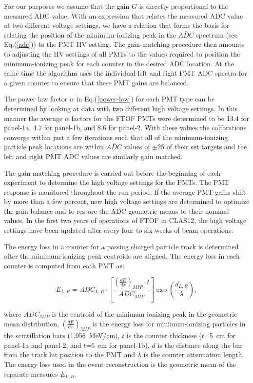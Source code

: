 \documentclass{elsart}
\begin{document}
\noindent
For our purposes we assume that the gain $G$ is directly proportional to the measured ADC value. With an
expression that relates the measured ADC value at two different voltage settings, we have a relation that
forms the basis for relating the position of the minimum-ionizing peak in the $\overline{ADC}$ spectrum
(see Eq.(\ref{adc})) to the PMT HV setting. The gain-matching procedure then amounts to adjusting the HV
settings of all PMTs to the values required to position the minimum-ionizing peak for each counter in the
desired ADC location. At the same time the algorithm uses the individual left and right PMT ADC spectra for
a given counter to ensure that these PMT gains are balanced.

The power law factor $\alpha$ in Eq.(\ref{power-law}) for each PMT type can be determined by looking
at data with two different high voltage settings. In this manner the average $\alpha$ factors for the
FTOF PMTs were determined to be 13.4 for panel-1a, 4.7 for panel-1b, and 8.6 for panel-2. With these
values the calibrations converge within just a few iterations such that all of the minimum-ionizing particle
peak locations are within $\overline{ADC}$ values of $\pm$25 of their set targets and the left and right
PMT ADC values are similarly gain matched.

The gain matching procedure is carried out before the beginning of each experiment to determine the
high voltage settings for the PMTs. The PMT response is monitored throughout the run period. If the
average PMT gains shift by more than a few percent, new high voltage settings are determined to
optimize the gain balance and to restore the ADC geometric means to their nominal values. In the first two
years of operations of FTOF in CLAS12, the high voltage settings have been updated after every four to
six weeks of beam operations.

The energy loss in a counter for a passing charged particle track is determined after the
minimum-ionizing peak centroids are aligned. The energy loss in each counter is computed from each
PMT as:

\begin{equation}
E_{L,R} = ADC_{L,R} \cdot \left [ \frac{\left( \frac{dE}{dx} \right)_{MIP} \cdot t}{ADC_{MIP}}\right ]
\exp\left(\frac{d_{L,R}}{\lambda}\right),
\end{equation}

\noindent
where $ADC_{MIP}$ is the centroid of the minimum-ionizing peak in the geometric mean distribution,
$\left( \frac{dE}{dx} \right)_{MIP}$ is the energy loss for minimum-ionizing particles in the scintillation
bars (1.956~MeV/cm), $t$ is the counter thickness ($t$=5~cm for panel-1a and panel-2, and $t$=6~cm
for panel-1b), $d$ is the distance along the bar from the track hit position to the PMT and $\lambda$ is
the counter attenuation length. The energy loss used in the event reconstruction is the geometric mean of
the separate measures $E_{L,R}$.
\end{document}
